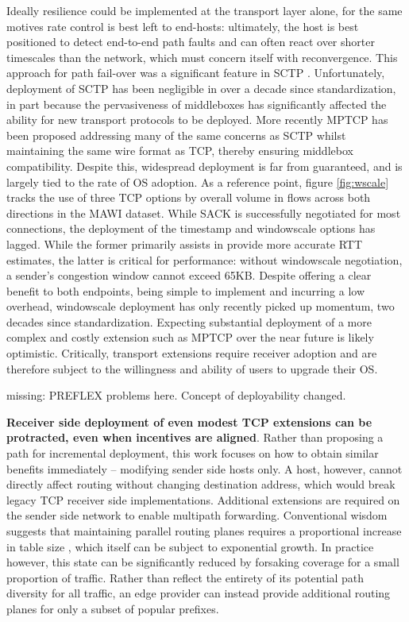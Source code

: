 Ideally resilience could be implemented at the transport layer alone, for the same motives rate control is best left to end-hosts: ultimately, the host is best positioned to detect end-to-end path faults and can often react over shorter timescales than the network, which must concern itself with reconvergence.
This approach for path fail-over was a significant feature in \ac{SCTP} \cite{rfc4960}.
Unfortunately, deployment of \ac{SCTP} has been negligible in over a decade since standardization, in part because the pervasiveness of middleboxes has significantly affected the ability for new transport protocols to be deployed.
More recently \ac{MPTCP} \cite{Wischik:2008p137} has been proposed addressing many of the same concerns as \ac{SCTP} whilst maintaining the same wire format as \ac{TCP}, thereby ensuring middlebox compatibility.
Despite this, widespread deployment is far from guaranteed, and is largely tied to the rate of \ac{OS} adoption.
As a reference point, figure \ref{fig:wscale} tracks the use of three \ac{TCP} options by overall volume in flows across both directions in the \ac{MAWI} dataset.
While \ac{SACK} is successfully negotiated for most connections, the deployment of the timestamp and windowscale options has lagged.
While the former primarily assists in provide more accurate \ac{RTT} estimates, the latter is critical for performance: without windowscale negotiation, a sender's congestion window cannot exceed 65KB.
Despite offering a clear benefit to both endpoints, being simple to implement and incurring a low overhead, windowscale deployment has only recently picked up momentum, two decades since standardization.
Expecting substantial deployment of a more complex and costly extension such as \ac{MPTCP} over the near future is likely optimistic.
Critically, transport extensions require receiver adoption and are therefore subject to the willingness and ability of users to upgrade their OS.

{\COMMENT missing: PREFLEX problems here. Concept of deployability changed.}

\textbf{Receiver side deployment of even modest \ac{TCP} extensions can be protracted, even when incentives are aligned}. 
Rather than proposing a path for incremental deployment, this work focuses on how to obtain similar benefits immediately -- modifying sender side hosts only. 
A host, however, cannot directly affect routing without changing destination address, which would break legacy \ac{TCP} receiver side implementations. Additional extensions are required on the sender side network to enable multipath forwarding.
Conventional wisdom suggests that maintaining parallel routing planes requires a proportional increase in table size \cite{NingWang:2008p145}, which itself can be subject to exponential growth.
In practice however, this state can be significantly reduced by forsaking coverage for a small proportion of traffic.
Rather than reflect the entirety of its potential path diversity for all traffic, an edge provider can instead provide additional routing planes for only a subset of popular prefixes.


